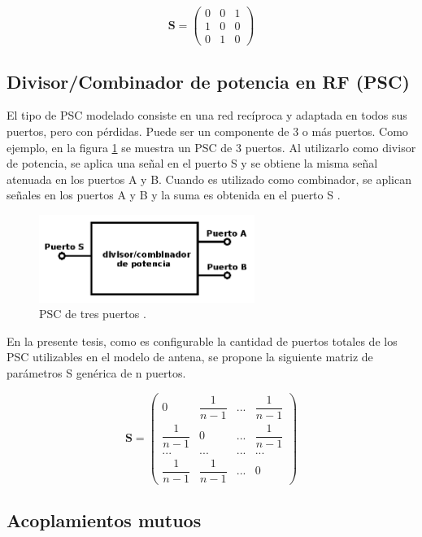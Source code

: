 $$
\mathbf{S} = \begin{pmatrix} 0 & 0 & 1\\1 & 0 & 0\\0 & 1 & 0\end{pmatrix}
$$


\subsection{Divisor/Combinador de potencia en RF (PSC)}

El tipo de PSC modelado consiste en una red recíproca y adaptada en todos sus puertos, pero con pérdidas. Puede ser un
componente de 3 o más puertos. Como ejemplo, en la figura \ref{fig:3PortsPSC} se muestra un PSC de 3 puertos. Al utilizarlo como
divisor de potencia, se aplica una señal en el puerto S y se obtiene la misma señal atenuada en los puertos A y B. Cuando es
utilizado como combinador, se aplican señales en los puertos A y B y la suma es obtenida en el puerto S \cite{MiniCircuits2015}.

\begin{figure}[H]
 \centering
 \includegraphics[width=7cm]{gfx/3PortsPSC.png}
 \caption{PSC de tres puertos \cite{MiniCircuits2015}.}
 \label{fig:3PortsPSC}
\end{figure}

En la presente tesis, como es configurable la cantidad de puertos totales de los PSC utilizables en el modelo de antena, se 
propone la siguiente matriz de parámetros S genérica de n puertos.

$$
\mathbf{S} = \begin{pmatrix} 0 & \dfrac{1}{n-1} & ... & \dfrac{1}{n-1}\\
							 \dfrac{1}{n-1} & 0 & ... & \dfrac{1}{n-1}\\
							 ... & ... & ... & ... \\
							 \dfrac{1}{n-1} & \dfrac{1}{n-1} & ... & 0 \end{pmatrix}
$$

\subsection{Acoplamientos mutuos}

